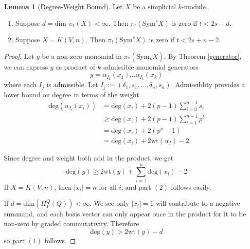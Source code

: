 \documentclass{article}
\newcommand{\Sym}{\textrm{Sym}}
\theoremstyle{definition}
\theoremstyle{definition}
\theoremstyle{definition}
\theoremstyle{definition}
\theoremstyle{definition}
\theoremstyle{definition}
\newtheorem{lemma}[theorem]{Lemma}
\theoremstyle{definition}
\theoremstyle{definition}
\begin{document}
\begin{lemma}[Degree-Weight Bound]
    \label{degree_weight}
   Let $X$ be a simplicial $k$-module. 
   \begin{enumerate}
    \item Suppose $d=\textrm{dim } \pi_1(X)<\infty$. Then $\pi_t(\Sym^s X)$ is zero if $t<2s-d$.
    \item Suppose $X= K(V,n)$. Then $\pi_t(\Sym^s X)$ is zero if $t<2s+n-2$.
   \end{enumerate}
   
   
   
\end{lemma}
\begin{proof}
    Let $y$ be a non-zero monomial in $\pi_*(\Sym_k X)$. By Theorem \ref{generator}, we can express $y$ as product of $k$ admissible monomial generators
    \[y=\alpha_{I_1}(x_1)...\alpha_{I_k}(x_k)\]
    where each $I_j$ is admissible. Let $I_j:=(\delta_1,s_1,...,\delta_n,s_n)$. Admissiblity provides a lower bound on degree in terms of the weight 
      \begin{equation*}
    \begin{aligned}
        \textrm{deg}(\alpha_{I_i}(x_i)) & = \textrm{deg}(x_i)+2(p-1)\sum_{i=0}^{n-1}s_i \\
        &\geq \textrm{deg}(x_i)+2(p-1)\sum_{i=1}^{n-1}p^i \\
        &=\textrm{deg}(x_i) + 2(p^{n}-1) \\
        &=\textrm{deg}(x_i)+ 2 \textrm{wt}(\alpha_I) -2 
    \end{aligned}
\end{equation*}

Since degree and weight both add in the product, we get 
\[\textrm{deg}(y)\geq 2 \textrm{wt}(y) + \sum^k_{i=1} \textrm{deg}(x_i)-2 \]
If $X=K(V,n)$, then $|x_i|=n$ for all $i$, and part $(2)$ follows easily.


If $d=\textrm{dim}(H^Q_1(Q))<\infty$. We see only $|x_i|=1$ will contribute to a negative summand, and each basis vector can only appear once in the product for it to be non-zero by graded commutativity. Therefore
\[\textrm{deg}(y)>2 \textrm{wt}(y)-d\]
so part $(1)$ follows.




  
\end{proof}
\end{document}
